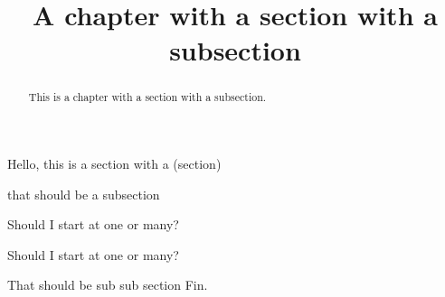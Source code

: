 \documentclass{ximera}
\title{A chapter with a section with a subsection}
\begin{document}
\begin{abstract}
  This is a chapter with a section with a subsection.
\end{abstract}
\maketitle




Hello, this is a section with a (section)


that should be a subsection


\begin{theorem}
  Should I start at one or many?
\end{theorem}


\begin{theorem}
  Should I start at one or many?
\end{theorem}


That should be sub sub section
Fin.
\end{document}
